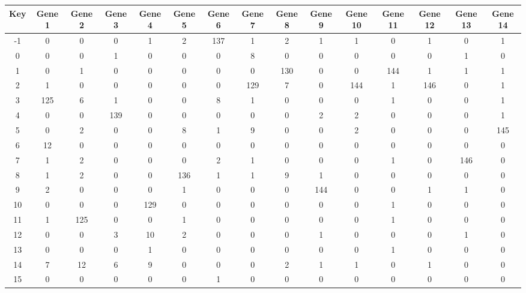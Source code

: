 \begin{tabular}{|c|c|c|c|c|c|c|c|c|c|c|c|c|c|c|}
\hline
Key & Gene 1 & Gene 2 & Gene 3 & Gene 4 & Gene 5 & Gene 6 & Gene 7 & Gene 8 & Gene 9 & Gene 10 & Gene 11 & Gene 12 & Gene 13 & Gene 14 \\
\hline
-1 & 0 & 0 & 0 & 1 & 2 & 137 & 1 & 2 & 1 & 1 & 0 & 1 & 0 & 1 \\
0 & 0 & 0 & 1 & 0 & 0 & 0 & 8 & 0 & 0 & 0 & 0 & 0 & 1 & 0 \\
1 & 0 & 1 & 0 & 0 & 0 & 0 & 0 & 130 & 0 & 0 & 144 & 1 & 1 & 1 \\
2 & 1 & 0 & 0 & 0 & 0 & 0 & 129 & 7 & 0 & 144 & 1 & 146 & 0 & 1 \\
3 & 125 & 6 & 1 & 0 & 0 & 8 & 1 & 0 & 0 & 0 & 1 & 0 & 0 & 1 \\
4 & 0 & 0 & 139 & 0 & 0 & 0 & 0 & 0 & 2 & 2 & 0 & 0 & 0 & 1 \\
5 & 0 & 2 & 0 & 0 & 8 & 1 & 9 & 0 & 0 & 2 & 0 & 0 & 0 & 145 \\
6 & 12 & 0 & 0 & 0 & 0 & 0 & 0 & 0 & 0 & 0 & 0 & 0 & 0 & 0 \\
7 & 1 & 2 & 0 & 0 & 0 & 2 & 1 & 0 & 0 & 0 & 1 & 0 & 146 & 0 \\
8 & 1 & 2 & 0 & 0 & 136 & 1 & 1 & 9 & 1 & 0 & 0 & 0 & 0 & 0 \\
9 & 2 & 0 & 0 & 0 & 1 & 0 & 0 & 0 & 144 & 0 & 0 & 1 & 1 & 0 \\
10 & 0 & 0 & 0 & 129 & 0 & 0 & 0 & 0 & 0 & 0 & 1 & 0 & 0 & 0 \\
11 & 1 & 125 & 0 & 0 & 1 & 0 & 0 & 0 & 0 & 0 & 1 & 0 & 0 & 0 \\
12 & 0 & 0 & 3 & 10 & 2 & 0 & 0 & 0 & 1 & 0 & 0 & 0 & 1 & 0 \\
13 & 0 & 0 & 0 & 1 & 0 & 0 & 0 & 0 & 0 & 0 & 1 & 0 & 0 & 0 \\
14 & 7 & 12 & 6 & 9 & 0 & 0 & 0 & 2 & 1 & 1 & 0 & 1 & 0 & 0 \\
15 & 0 & 0 & 0 & 0 & 0 & 1 & 0 & 0 & 0 & 0 & 0 & 0 & 0 & 0 \\
\hline
\end{tabular}